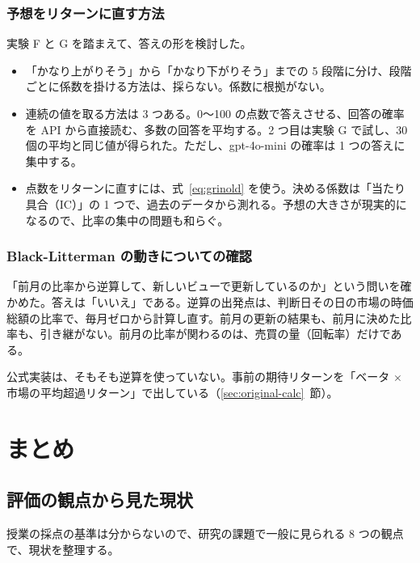 \documentclass[xelatex,ja=standard,jafont=hiragino-pron,a4paper,10pt]{bxjsreport}
\newcommand{\secref}[1]{\ref{#1}~節}
\begin{document}
\section{予想をリターンに直す方法}

実験 F と G を踏まえて、答えの形を検討した。

\begin{itemize}
\item 「かなり上がりそう」から「かなり下がりそう」までの 5 段階に分け、段階ごとに係数を掛ける方法は、採らない。係数に根拠がない。
\item 連続の値を取る方法は 3 つある。0〜100 の点数で答えさせる、回答の確率を API から直接読む、多数の回答を平均する。2 つ目は実験 G で試し、30 個の平均と同じ値が得られた。ただし、gpt-4o-mini の確率は 1 つの答えに集中する。
\item 点数をリターンに直すには、式~\eqref{eq:grinold} を使う。決める係数は「当たり具合（IC）」の 1 つで、過去のデータから測れる。予想の大きさが現実的になるので、比率の集中の問題も和らぐ。
\end{itemize}

\section{Black-Litterman の動きについての確認}

「前月の比率から逆算して、新しいビューで更新しているのか」という問いを確かめた。答えは「いいえ」である。逆算の出発点は、判断日その日の市場の時価総額の比率で、毎月ゼロから計算し直す。前月の更新の結果も、前月に決めた比率も、引き継がない。前月の比率が関わるのは、売買の量（回転率）だけである。

公式実装は、そもそも逆算を使っていない。事前の期待リターンを「ベータ $\times$ 市場の平均超過リターン」で出している（\secref{sec:original-calc}）。

\part{まとめ}

\chapter{評価の観点から見た現状}\label{ch:eval}

授業の採点の基準は分からないので、研究の課題で一般に見られる 8 つの観点で、現状を整理する。
\end{document}
